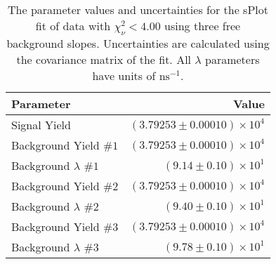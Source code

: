 
\begin{table}[ht]
    \begin{center}
        \begin{tabular}{lr}\toprule
            Parameter & Value \\\midrule
            Signal Yield & $(3.79253 \pm 0.00010) \times 10^{4}$ \\
            Background Yield $\#1$ & $(3.79253 \pm 0.00010) \times 10^{4}$ \\
            Background $\lambda$ $\#1$ & $(9.14 \pm 0.10) \times 10^{1}$ \\
            Background Yield $\#2$ & $(3.79253 \pm 0.00010) \times 10^{4}$ \\
            Background $\lambda$ $\#2$ & $(9.40 \pm 0.10) \times 10^{1}$ \\
            Background Yield $\#3$ & $(3.79253 \pm 0.00010) \times 10^{4}$ \\
            Background $\lambda$ $\#3$ & $(9.78 \pm 0.10) \times 10^{1}$ \\\bottomrule
        \end{tabular}
        \caption{The parameter values and uncertainties for the sPlot fit of data with $\chi^2_\nu < 4.00$ using three free background slopes. Uncertainties are calculated using the covariance matrix of the fit. All $\lambda$ parameters have units of $\si{\nano\second}^{-1}$.}\label{tab:splot-fit-results-chisqdof-4.00-free-3}
    \end{center}
\end{table}
